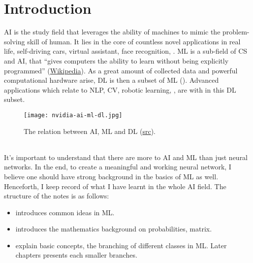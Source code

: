 \chapter{Introduction}

\ac{AI} is the study field that leverages the ability of machines to mimic the problem-solving skill of human. It lies in the core of countless novel applications in real life, self-driving cars, virtual assistant, face recognition, \etc. \ac{ML} is a sub-field of \ac{CS} and \ac{AI}, that “gives computers the ability to learn without being explicitly programmed” (\href{https://en.wikipedia.org/wiki/Machine_learning}{Wikipedia}). As a great amount of collected data and powerful computational hardware arise, \ac{DL} is then a subset of \ac{ML} (). Advanced applications which relate to \ac{NLP}, \ac{CV}, robotic learning, \etc, are with in this \ac{DL} subset.
\begin{figure}[hbt!]
	\centering
	\texttt{[image: nvidia-ai-ml-dl.jpg]}
	\caption{The relation between \ac{AI}, \ac{ML} and \ac{DL} (\href{https://developer.nvidia.com/deep-learning}{src}).}
	\label{fig:relation-ai-ml-dl}
\end{figure}

\\
It's important to understand that there are more to \ac{AI} and \ac{ML} than just neural networks. In the end, to create a meaningful and working neural network, I believe one should have strong background in the basics of \ac{ML} as well. Henceforth, I keep record of what I have learnt in the whole \ac{AI} field. The structure of the notes is as follows:
\begin{itemize}
	\item {} introduces common ideas in \ac{ML}.
	\item {} introduces the mathematics background on probabilities, matrix.
	\item {} explain basic concepts, the branching of different classes in \ac{ML}. Later chapters presents each smaller branches.
\end{itemize}